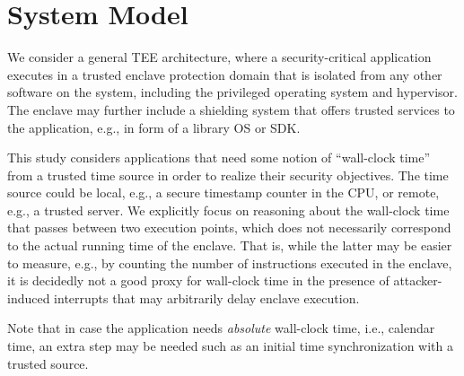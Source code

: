 \documentclass[sigplan,10pt]{acmart}
\begin{document}








\section{System Model}


We consider a general \ac{TEE} architecture, where a security-critical
application executes in a trusted enclave protection domain that is isolated
from any other software on the system, including the privileged operating system
and hypervisor. The enclave may further include a shielding system that offers
trusted services to the application, e.g., in form of a library OS or \ac{SDK}.

This study considers applications that need some notion of ``wall-clock time''
from a trusted time source in order to realize their security objectives. The
time source could be local, e.g., a secure timestamp counter in the CPU, or
remote, e.g., a trusted server. We explicitly focus on reasoning about the
wall-clock time that passes between two execution points, which does not
necessarily correspond to the actual running time of the enclave. That is, while
the latter may be easier to measure, e.g., by counting the number of
instructions executed in the enclave, it is decidedly {not} a good proxy for
wall-clock time in the presence of attacker-induced interrupts that may
arbitrarily delay enclave execution.

Note that in case the application needs \emph{absolute} wall-clock time, i.e., calendar time, an extra step may be needed such as an initial time synchronization with a trusted source.
\end{document}
